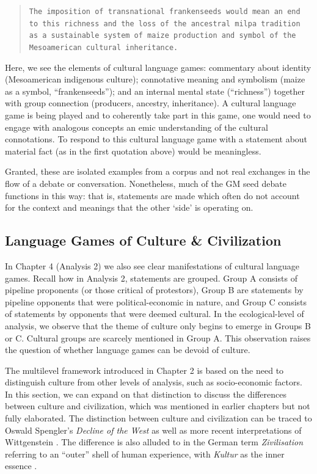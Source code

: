 \begin{footnotesize}
\begin{quote}
\texttt{The imposition of transnational frankenseeds would mean an end to this richness and the loss of the ancestral milpa tradition as a sustainable system of maize production and symbol of the Mesoamerican cultural inheritance.}
\end{quote}
\end{footnotesize}

Here, we see the elements of cultural language games: commentary about identity (Mesoamerican indigenous culture); connotative meaning and symbolism (maize as a symbol, ``frankenseeds''); and an internal mental state (``richness'') together with group connection (producers, ancestry, inheritance). A cultural language game is being played and to coherently take part in this game, one would need to engage with analogous concepts an emic understanding of the cultural connotations. To respond to this cultural language game with a statement about material fact (as in the first quotation above) would be meaningless.

Granted, these are isolated examples from a corpus and not real exchanges in the flow of a debate or conversation. Nonetheless, much of the GM seed debate functions in this way: that is, statements are made which often do not account for the context and meanings that the other `side' is operating on.  

\subsection{Language Games of Culture \& Civilization}

In Chapter 4 (Analysis 2) we also see clear manifestations of cultural language games. Recall how in Analysis 2, statements are grouped. Group A consists of pipeline proponents (or those critical of protestors), Group B are statements by pipeline opponents that were political-economic in nature, and Group C consists of statements by opponents that were deemed cultural. In the ecological-level of analysis, we observe that the theme of culture only begins to emerge in Groups B or C. Cultural groups are scarcely mentioned in Group A. This observation raises the question of whether language games can be devoid of culture.  
 
The multilevel framework introduced in Chapter 2 is based on the need to distinguish culture from other levels of analysis, such as socio-economic factors. In this section, we can expand on that distinction to discuss the differences between culture and civilization, which was mentioned in earlier chapters but not fully elaborated. The distinction between culture and civilization can be traced to Oswald Spengler's \textit{Decline of the West} as well as more recent interpretations of Wittgenstein \citep{Cavell1988a, Cavell2013a, DeAngelis2007a}. The difference is also alluded to in the German term \textit{Zivilisation} referring to an ``outer'' shell of human experience, with \textit{Kultur} as the inner essence \citep[11]{Botz-Bornstein2012a}.

